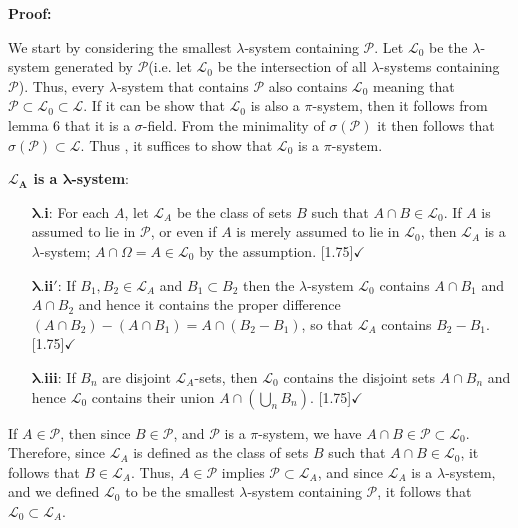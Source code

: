     \textbf{Proof: }
    \vspace{-1ex}
    \begin{proofline}
        We start by considering the smallest $\lambda$-system containing $\mathcal{P}$. Let $\mathcal{L}_0$ be the $\lambda$-system generated by $\mathcal{P}$(i.e. let $\mathcal{L}_0$ be the intersection of all $\lambda$-systems containing $\mathcal{P}$). Thus, every $\lambda$-system that contains $\mathcal{P}$ also contains $\mathcal{L}_0$ meaning that $\mathcal{P}\subset \mathcal{L}_0 \subset \mathcal{L}$. If it can be show that $\mathcal{L}_0$ is also a $\pi$-system, then it follows from lemma 6 that it is a $\sigma$-field. From the minimality of $\sigma(\mathcal{P})$ it then follows that $\sigma(\mathcal{P})\subset \mathcal{L}$. Thus , it suffices to show that $\mathcal{L}_0$ is a $\pi$-system.

        \textbf{$\boldsymbol{\mathcal{L}_A}$ is a $\boldsymbol{\lambda}$-system}:
        \vspace{-1ex}
        \begin{proofline}
             \begin{itemize}[nosep]
             \item[$\boldsymbol{\lambda.}$\textbf{i}:] For each $A$, let $\mathcal{L}_A$ be the class of sets $B$ such that $A\cap B \in \mathcal{L}_0$. If $A$ is assumed to lie in $\mathcal{P}$, or even if $A$ is merely assumed to lie in $\mathcal{L}_0$, then $\mathcal{L}_A$ is a $\lambda$-system; $A\cap \Omega = A \in \mathcal{L}_0$ by the assumption. \quad \scalebox{1.75}[1.75]{$\checkmark$}
             \item[$\boldsymbol{\lambda.}$\textbf{ii}$\boldsymbol{'}$:] If $B_1, B_2 \in \mathcal{L}_A$ and $B_1 \subset B_2$ then the  $\lambda$-system $\mathcal{L}_0$ contains $A\cap B_1$ and $A\cap B_2$ and hence it contains the proper difference $(A \cap B_2)-(A\cap B_1)=A\cap (B_2-B_1)$, so that $\mathcal{L}_A$ contains $B_2-B_1$.  \quad \scalebox{1.75}[1.75]{$\checkmark$}
             \item[$\boldsymbol{\lambda.}$\textbf{iii}:] If $B_n$ are disjoint $\mathcal{L}_A$-sets, then $\mathcal{L}_0$ contains the disjoint sets $A \cap B_n$ and hence $\mathcal{L}_0$ contains their union $A\cap(\bigcup_n  B_n)$.  \quad \scalebox{1.75}[1.75]{$\checkmark$}
             \end{itemize}
        \end{proofline}

        If \( A \in \mathcal{P} \), then since \( B \in \mathcal{P} \), and \( \mathcal{P} \) is a \(\pi\)-system, we have \( A \cap B \in \mathcal{P} \subset \mathcal{L}_0 \).  
        Therefore, since \( \mathcal{L}_A \) is defined as the class of sets $B$ such that $A\cap B \in \mathcal{L}_0$, it follows that \( B \in \mathcal{L}_A \). Thus, $A \in \mathcal{P}$ implies $\mathcal{P} \subset \mathcal{L}_A$, and since $\mathcal{L}_A$ is a $\lambda$-system, and we defined $\mathcal{L}_0$ to be the smallest $\lambda$-system containing $\mathcal{P}$, it follows that $\mathcal{L}_0 \subset \mathcal{L}_A$.


\end{proofline}
